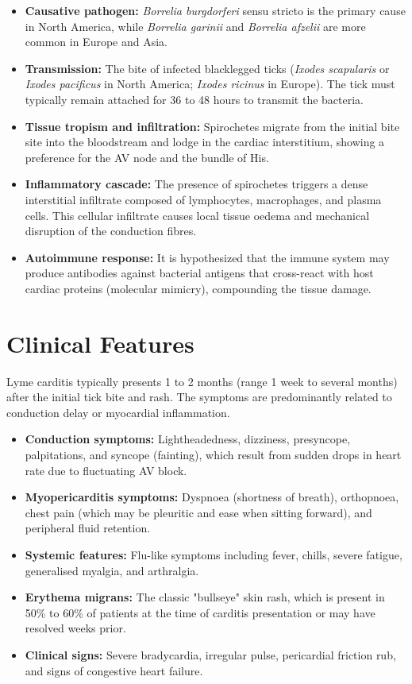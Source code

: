 \begin{itemize}
    \item \textbf{Causative pathogen:} \textit{Borrelia burgdorferi} sensu stricto is the primary cause in North America, while \textit{Borrelia garinii} and \textit{Borrelia afzelii} are more common in Europe and Asia.
    \item \textbf{Transmission:} The bite of infected blacklegged ticks (\textit{Ixodes scapularis} or \textit{Ixodes pacificus} in North America; \textit{Ixodes ricinus} in Europe). The tick must typically remain attached for 36 to 48 hours to transmit the bacteria.
    \item \textbf{Tissue tropism and infiltration:} Spirochetes migrate from the initial bite site into the bloodstream and lodge in the cardiac interstitium, showing a preference for the AV node and the bundle of His.
    \item \textbf{Inflammatory cascade:} The presence of spirochetes triggers a dense interstitial infiltrate composed of lymphocytes, macrophages, and plasma cells. This cellular infiltrate causes local tissue oedema and mechanical disruption of the conduction fibres.
    \item \textbf{Autoimmune response:} It is hypothesized that the immune system may produce antibodies against bacterial antigens that cross-react with host cardiac proteins (molecular mimicry), compounding the tissue damage.
\end{itemize}

\section*{Clinical Features}
Lyme carditis typically presents 1 to 2 months (range 1 week to several months) after the initial tick bite and rash. The symptoms are predominantly related to conduction delay or myocardial inflammation.

\begin{itemize}
    \item \textbf{Conduction symptoms:} Lightheadedness, dizziness, presyncope, palpitations, and syncope (fainting), which result from sudden drops in heart rate due to fluctuating AV block.
    \item \textbf{Myopericarditis symptoms:} Dyspnoea (shortness of breath), orthopnoea, chest pain (which may be pleuritic and ease when sitting forward), and peripheral fluid retention.
    \item \textbf{Systemic features:} Flu-like symptoms including fever, chills, severe fatigue, generalised myalgia, and arthralgia.
    \item \textbf{Erythema migrans:} The classic "bullseye" skin rash, which is present in 50\% to 60\% of patients at the time of carditis presentation or may have resolved weeks prior.
    \item \textbf{Clinical signs:} Severe bradycardia, irregular pulse, pericardial friction rub, and signs of congestive heart failure.
\end{itemize}


